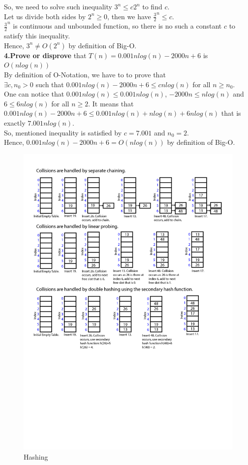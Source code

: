\documentclass[11pt]{article}
\begin{document}
So, we need to solve such inequality $3^{n} \leq c2^{n}$ to find $c$.\\
Let us divide both sides by $2^{n}\geq0$, then we have $\frac{3}{2}^{n} \leq c$.\\
$\frac{3}{2}^{n}$ is continuous and unbounded function, so there is no such a constant $c$ to satisfy this inequality.\\
Hence, $3^{n}\neq O(2^{n})$ by definition of Big-O.\\
\noindent \textbf{4.Prove or disprove} that $T(n)=0.001 n log(n) - 2000 n + 6$ is $O(n log(n))$\\
By definition of O-Notation, we have to to prove that \\$\exists c, n_{0} > 0$ such that $0.001 n log(n) - 2000 n + 6 \leq cn log(n)$ for all $n \geq n_{0}$.\\ 
One can notice that $0.001 n log(n) \leq 0.001 n log(n)$, $-2000n \leq n log(n)$ and $6 \leq 6 n log(n)$ for all $n\geq2$. It means that $0.001 n log(n) - 2000 n + 6 \leq 0.001 n log(n) + n log(n) + 6 n log(n)$ that is exactly $7.001n log(n)$.\\
So, mentioned inequality is satisfied by $c=7.001$ and $n_{0}=2$.\\
Hence, $0.001 n log(n) - 2000 n + 6=O(n log(n))$ by definition of Big-O.\\

\begin{figure}[h]
\centering
\includegraphics[width=0.8\linewidth]{Hashing.jpg}
\caption{Hashing}
\label{fig:mpr}
\end{figure}
\end{document}
